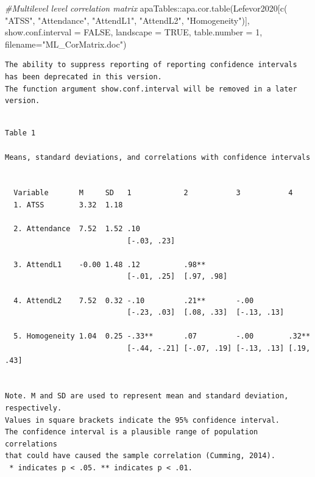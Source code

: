 \documentclass[
  english,
]{book}
\newenvironment{Shaded}{\begin{snugshade}}{\end{snugshade}}
\newcommand{\AttributeTok}[1]{\textcolor[rgb]{0.77,0.63,0.00}{#1}}
\newcommand{\CommentTok}[1]{\textcolor[rgb]{0.56,0.35,0.01}{\textit{#1}}}
\newcommand{\ConstantTok}[1]{\textcolor[rgb]{0.00,0.00,0.00}{#1}}
\newcommand{\DecValTok}[1]{\textcolor[rgb]{0.00,0.00,0.81}{#1}}
\newcommand{\FunctionTok}[1]{\textcolor[rgb]{0.00,0.00,0.00}{#1}}
\newcommand{\NormalTok}[1]{#1}
\newcommand{\SpecialCharTok}[1]{\textcolor[rgb]{0.00,0.00,0.00}{#1}}
\newcommand{\StringTok}[1]{\textcolor[rgb]{0.31,0.60,0.02}{#1}}
\begin{document}
\begin{Shaded}
\begin{Highlighting}[]
\CommentTok{\#Multilevel level correlation matrix}
\NormalTok{apaTables}\SpecialCharTok{::}\FunctionTok{apa.cor.table}\NormalTok{(Lefevor2020[}\FunctionTok{c}\NormalTok{(}
\StringTok{"ATSS"}\NormalTok{, }\StringTok{"Attendance"}\NormalTok{, }\StringTok{"AttendL1"}\NormalTok{, }\StringTok{"AttendL2"}\NormalTok{, }\StringTok{"Homogeneity"}\NormalTok{)], }\AttributeTok{show.conf.interval =} \ConstantTok{FALSE}\NormalTok{, }\AttributeTok{landscape =} \ConstantTok{TRUE}\NormalTok{, }\AttributeTok{table.number =} \DecValTok{1}\NormalTok{, }\AttributeTok{filename=}\StringTok{"ML\_CorMatrix.doc"}\NormalTok{)}
\end{Highlighting}
\end{Shaded}

\begin{verbatim}
The ability to suppress reporting of reporting confidence intervals has been deprecated in this version.
The function argument show.conf.interval will be removed in a later version.
\end{verbatim}

\begin{verbatim}

Table 1 

Means, standard deviations, and correlations with confidence intervals
 

  Variable       M     SD   1            2           3           4         
  1. ATSS        3.32  1.18                                                
                                                                           
  2. Attendance  7.52  1.52 .10                                            
                            [-.03, .23]                                    
                                                                           
  3. AttendL1    -0.00 1.48 .12          .98**                             
                            [-.01, .25]  [.97, .98]                        
                                                                           
  4. AttendL2    7.52  0.32 -.10         .21**       -.00                  
                            [-.23, .03]  [.08, .33]  [-.13, .13]           
                                                                           
  5. Homogeneity 1.04  0.25 -.33**       .07         -.00        .32**     
                            [-.44, -.21] [-.07, .19] [-.13, .13] [.19, .43]
                                                                           

Note. M and SD are used to represent mean and standard deviation, respectively.
Values in square brackets indicate the 95% confidence interval.
The confidence interval is a plausible range of population correlations 
that could have caused the sample correlation (Cumming, 2014).
 * indicates p < .05. ** indicates p < .01.
 
\end{verbatim}
\end{document}
